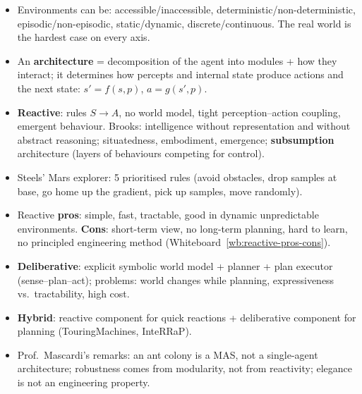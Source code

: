 \begin{nbsummary}
\begin{itemize}[nosep]
  \item Environments can be: accessible/inaccessible, deterministic/non-deterministic,
        episodic/non-episodic, static/dynamic, discrete/continuous. The real world is the
        hardest case on every axis.
  \item An \textbf{architecture} = decomposition of the agent into modules + how they
        interact; it determines how percepts and internal state produce actions and the next
        state: $s' = f(s, p)$, $a = g(s', p)$.
  \item \textbf{Reactive}: rules $S \to A$, no world model, tight perception--action
        coupling, emergent behaviour. Brooks: intelligence without representation and without
        abstract reasoning; situatedness, embodiment, emergence; \textbf{subsumption}
        architecture (layers of behaviours competing for control).
  \item Steels' Mars explorer: 5 prioritised rules (avoid obstacles, drop samples at base,
        go home up the gradient, pick up samples, move randomly).
  \item Reactive \textbf{pros}: simple, fast, tractable, good in dynamic unpredictable
        environments. \textbf{Cons}: short-term view, no long-term planning, hard to
        learn, no principled engineering method (Whiteboard~\ref{wb:reactive-pros-cons}).
  \item \textbf{Deliberative}: explicit symbolic world model + planner + plan executor
        (sense--plan--act); problems: world changes while planning, expressiveness vs.\
        tractability, high cost.
  \item \textbf{Hybrid}: reactive component for quick reactions + deliberative component
        for planning (TouringMachines, InteRRaP).
  \item Prof.\ Mascardi's remarks: an ant colony is a MAS, not a single-agent
        architecture; robustness comes from modularity, not from reactivity; elegance is
        not an engineering property.
\end{itemize}
\end{nbsummary}
